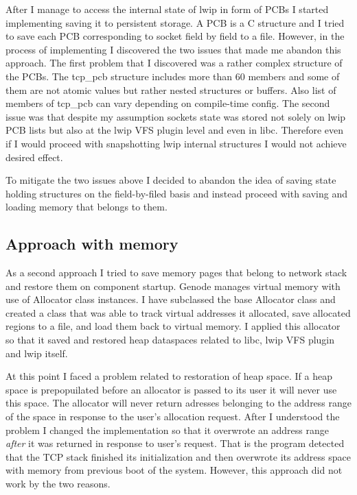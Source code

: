 After I manage to access the internal state of lwip in form of PCBs I started
implementing saving it to persistent storage. A PCB is a C structure and I
tried to save each PCB corresponding to socket field by field to a file.
However, in the process of implementing I discovered the two issues that made
me abandon this approach. The first problem that I discovered was a rather
complex structure of the PCBs. The tcp\_pcb structure includes more than 60
members and some of them are not atomic values but rather nested structures or
buffers. Also list of members of tcp\_pcb can vary depending on compile-time
config. The second issue was that despite my assumption sockets state was
stored not solely on lwip PCB lists but also at the lwip VFS plugin level and
even in libc. Therefore even if I would proceed with snapshotting lwip internal
structures I would not achieve desired effect.

To mitigate the two issues above I decided to abandon the idea of saving state
holding structures on the field-by-filed basis and instead proceed with saving
and loading memory that belongs to them.

\subsection{Approach with memory}
As a second approach I tried to save memory pages that belong to network stack
and restore them on component startup. Genode manages virtual memory with use
of Allocator class instances. I have subclassed the base Allocator class and
created a class that was able to track virtual addresses it allocated, save
allocated regions to a file, and load them back to virtual memory. I applied
this allocator so that it saved and restored heap dataspaces related to libc,
lwip VFS plugin and lwip itself.

At this point I faced a problem related to restoration of heap space. If a heap
space is prepopuilated before an allocator is passed to its user it will never
use this space. The allocator will never return adresses belonging to the
address range of the space in response to the user's allocation request. After
I understood the problem I changed the implementation so that it overwrote an
address range \textit{after} it was returned in response to user's request. That
is the program detected that the TCP stack finished its initialization and then
overwrote its address space with memory from previous boot of the system.
However, this approach did not work by the two reasons. 

